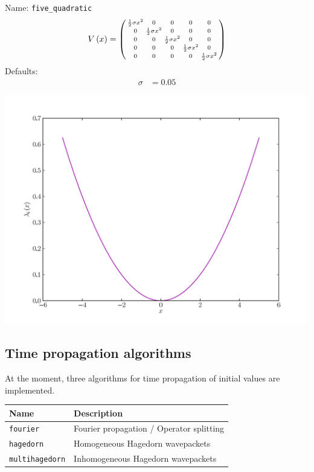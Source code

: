 \documentclass[a4paper,10pt]{report}
\begin{document}
\begin{minipage}{0.5\linewidth}
  Name:    \texttt{five\_quadratic}
  \begin{equation*}
    V\left( x \right) = \left(\begin{smallmatrix}\frac{1}{2} \sigma x^{2} & 0 & 0 & 0 & 0\\0 & \frac{1}{2} \sigma x^{2} & 0 & 0 & 0\\0 & 0 & \frac{1}{2} \sigma x^{2} & 0 & 0\\0 & 0 & 0 & \frac{1}{2} \sigma x^{2} & 0\\0 & 0 & 0 & 0 & \frac{1}{2} \sigma x^{2}\end{smallmatrix}\right)
  \end{equation*}
  Defaults:
  \begin{align*}
    \sigma & = 0.05
  \end{align*}
\end{minipage}
\begin{minipage}{0.5\linewidth}
  \begin{center}
    \includegraphics[scale=0.25]{./fig/five_quadratic.pdf}
  \end{center}
\end{minipage}


\subsection{Time propagation algorithms}

At the moment, three algorithms for time propagation of initial values are
implemented.

\begin{center}
\begin{tabular}{ll}
  Name & Description \\
  \hline
  \texttt{fourier} & Fourier propagation / Operator splitting \\
  \texttt{hagedorn} & Homogeneous Hagedorn wavepackets \\
  \texttt{multihagedorn} & Inhomogeneous Hagedorn wavepackets \\
\end{tabular}
\end{center}
\end{document}
